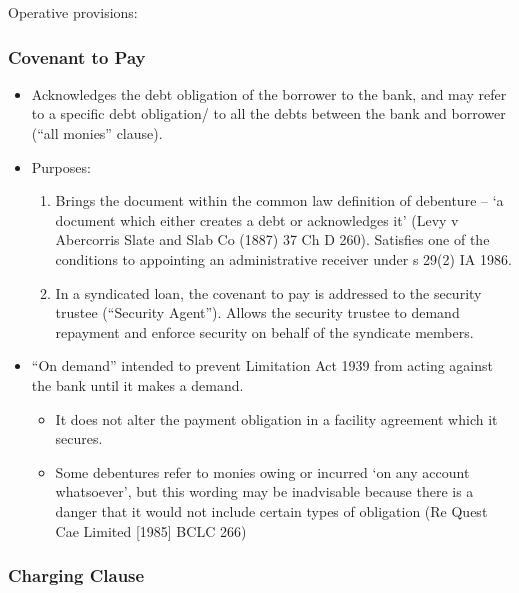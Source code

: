 \documentclass[
]{article}
\providecommand{\tightlist}{%
  \setlength{\itemsep}{0pt}\setlength{\parskip}{0pt}}
\begin{document}
Operative provisions:

\hypertarget{covenant-to-pay}{%
\subsubsection{Covenant to Pay}\label{covenant-to-pay}}

\begin{itemize}
\tightlist
\item
  Acknowledges the debt obligation of the borrower to the bank, and may
  refer to a specific debt obligation/ to all the debts between the bank
  and borrower (``all monies'' clause).
\item
  Purposes:

  \begin{enumerate}
  \tightlist
  \item
    Brings the document within the common law definition of debenture --
    `a document which either creates a debt or acknowledges it' (Levy v
    Abercorris Slate and Slab Co (1887) 37 Ch D 260). Satisfies one of
    the conditions to appointing an administrative receiver under s
    29(2) IA 1986.
  \item
    In a syndicated loan, the covenant to pay is addressed to the
    security trustee (``Security Agent''). Allows the security trustee
    to demand repayment and enforce security on behalf of the syndicate
    members.
  \end{enumerate}
\item
  ``On demand'' intended to prevent Limitation Act 1939 from acting
  against the bank until it makes a demand.

  \begin{itemize}
  \tightlist
  \item
    It does not alter the payment obligation in a facility agreement
    which it secures.
  \item
    Some debentures refer to monies owing or incurred `on any account
    whatsoever', but this wording may be inadvisable because there is a
    danger that it would not include certain types of obligation (Re
    Quest Cae Limited {[}1985{]} BCLC 266)
  \end{itemize}
\end{itemize}

\hypertarget{charging-clause}{%
\subsubsection{Charging Clause}\label{charging-clause}}
\end{document}
